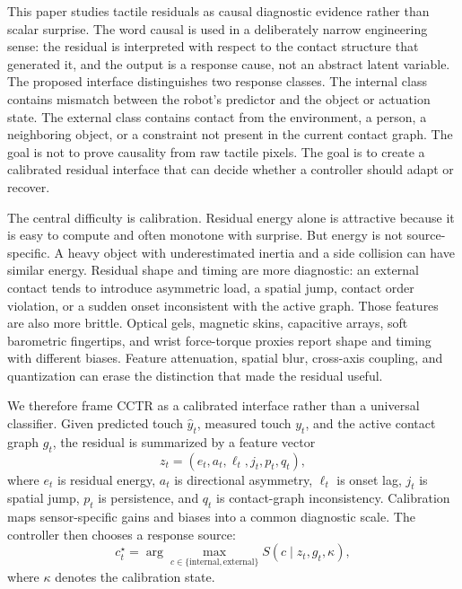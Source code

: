 \documentclass{article}
\newcommand{\method}{CCTR}
\begin{document}
This paper studies tactile residuals as causal diagnostic evidence rather than scalar surprise. The word causal is used in a deliberately narrow engineering sense: the residual is interpreted with respect to the contact structure that generated it, and the output is a response cause, not an abstract latent variable. The proposed interface distinguishes two response classes. The internal class contains mismatch between the robot's predictor and the object or actuation state. The external class contains contact from the environment, a person, a neighboring object, or a constraint not present in the current contact graph. The goal is not to prove causality from raw tactile pixels. The goal is to create a calibrated residual interface that can decide whether a controller should adapt or recover.

The central difficulty is calibration. Residual energy alone is attractive because it is easy to compute and often monotone with surprise. But energy is not source-specific. A heavy object with underestimated inertia and a side collision can have similar energy. Residual shape and timing are more diagnostic: an external contact tends to introduce asymmetric load, a spatial jump, contact order violation, or a sudden onset inconsistent with the active graph. Those features are also more brittle. Optical gels, magnetic skins, capacitive arrays, soft barometric fingertips, and wrist force-torque proxies report shape and timing with different biases. Feature attenuation, spatial blur, cross-axis coupling, and quantization can erase the distinction that made the residual useful.

We therefore frame \method{} as a calibrated interface rather than a universal classifier. Given predicted touch $\hat{y}_t$, measured touch $y_t$, and the active contact graph $g_t$, the residual is summarized by a feature vector
\[
z_t = (e_t, a_t, \ell_t, j_t, p_t, q_t),
\]
where $e_t$ is residual energy, $a_t$ is directional asymmetry, $\ell_t$ is onset lag, $j_t$ is spatial jump, $p_t$ is persistence, and $q_t$ is contact-graph inconsistency. Calibration maps sensor-specific gains and biases into a common diagnostic scale. The controller then chooses a response source:
\[
c^\star_t = \arg\max_{c \in \{\mathrm{internal},\mathrm{external}\}} S(c \mid z_t, g_t, \kappa),
\]
where $\kappa$ denotes the calibration state.
\end{document}
